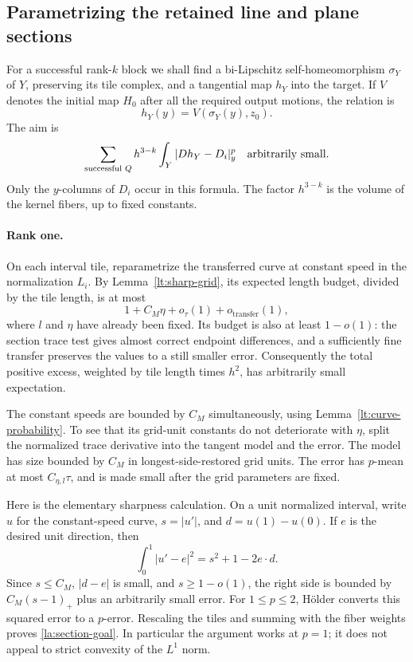 \subsection{Parametrizing the retained line and plane sections}

For a successful rank-$k$ block we shall find a bi-Lipschitz
self-homeomorphism $\sigma_Y$ of $Y$, preserving its tile complex,
and a tangential map $h_Y$ into the target.  If $V$ denotes the initial
map $H_0$ after all the required output motions, the relation is
\begin{equation}\label{la:section-parametrization}
 h_Y(y)=V(\sigma_Y(y),z_0).
\end{equation}
The aim is
\begin{equation}\label{la:section-goal}
 \sum_{\text{successful }Q}
   h^{3-k}\int_Y |Dh_Y-D_i|_y^p
       \quad\hbox{arbitrarily small}.
\end{equation}
Only the $y$-columns of $D_i$ occur in this formula.  The factor
$h^{3-k}$ is the volume of the kernel fibers, up to fixed constants.

\paragraph{Rank one.}
On each interval tile, reparametrize the transferred curve at
constant speed in the normalization $L_i$.  By
Lemma~\ref{lt:sharp-grid}, its expected length budget, divided by
the tile length, is at most
\begin{equation}\label{la:sharp-length-budget}
 1+C_M\eta+o_{\tau}(1)+o_{\mathrm{transfer}}(1),
\end{equation}
where $l$ and $\eta$ have already been fixed.  Its budget is also at
least $1-o(1)$: the section trace test gives almost correct endpoint
differences, and a sufficiently fine transfer preserves the values
to a still smaller error.  Consequently the total positive excess,
weighted by tile length times $h^2$, has arbitrarily small expectation.

The constant speeds are bounded by $C_M$ simultaneously, using
Lemma~\ref{lt:curve-probability}.  To see that its grid-unit constants
do not deteriorate with $\eta$, split the normalized trace derivative
into the tangent model and the error.  The model has size bounded by
$C_M$ in longest-side-restored grid units.  The error has $p$-mean at
most $C_{\eta,l}\tau$, and is made small after the grid parameters
are fixed.

Here is the elementary sharpness calculation.  On a unit normalized
interval, write $u$ for the constant-speed curve, $s=|u'|$, and
$d=u(1)-u(0)$.  If $e$ is the desired unit direction, then
\begin{equation}\label{la:length-sharpness}
 \int_0^1|u'-e|^2=s^2+1-2e\cdot d.
\end{equation}
Since $s\le C_M$, $|d-e|$ is small, and $s\ge1-o(1)$, the right side
is bounded by $C_M(s-1)_+$ plus an arbitrarily small error.
For $1\le p\le2$, H\"older converts this squared error to a
$p$-error.  Rescaling the tiles and summing with the fiber weights
proves \eqref{la:section-goal}.  In particular the argument works at
$p=1$; it does not appeal to strict convexity of the $L^1$ norm.

